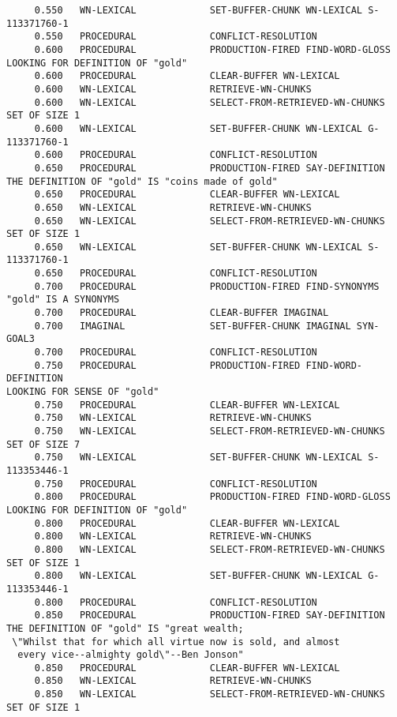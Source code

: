 \begin{verbatim}
     0.550   WN-LEXICAL             SET-BUFFER-CHUNK WN-LEXICAL S-113371760-1 
     0.550   PROCEDURAL             CONFLICT-RESOLUTION 
     0.600   PROCEDURAL             PRODUCTION-FIRED FIND-WORD-GLOSS 
LOOKING FOR DEFINITION OF "gold" 
     0.600   PROCEDURAL             CLEAR-BUFFER WN-LEXICAL 
     0.600   WN-LEXICAL             RETRIEVE-WN-CHUNKS 
     0.600   WN-LEXICAL             SELECT-FROM-RETRIEVED-WN-CHUNKS SET OF SIZE 1 
     0.600   WN-LEXICAL             SET-BUFFER-CHUNK WN-LEXICAL G-113371760-1 
     0.600   PROCEDURAL             CONFLICT-RESOLUTION 
     0.650   PROCEDURAL             PRODUCTION-FIRED SAY-DEFINITION 
THE DEFINITION OF "gold" IS "coins made of gold" 
     0.650   PROCEDURAL             CLEAR-BUFFER WN-LEXICAL 
     0.650   WN-LEXICAL             RETRIEVE-WN-CHUNKS 
     0.650   WN-LEXICAL             SELECT-FROM-RETRIEVED-WN-CHUNKS SET OF SIZE 1 
     0.650   WN-LEXICAL             SET-BUFFER-CHUNK WN-LEXICAL S-113371760-1 
     0.650   PROCEDURAL             CONFLICT-RESOLUTION 
     0.700   PROCEDURAL             PRODUCTION-FIRED FIND-SYNONYMS 
"gold" IS A SYNONYMS 
     0.700   PROCEDURAL             CLEAR-BUFFER IMAGINAL 
     0.700   IMAGINAL               SET-BUFFER-CHUNK IMAGINAL SYN-GOAL3 
     0.700   PROCEDURAL             CONFLICT-RESOLUTION 
     0.750   PROCEDURAL             PRODUCTION-FIRED FIND-WORD-DEFINITION 
LOOKING FOR SENSE OF "gold" 
     0.750   PROCEDURAL             CLEAR-BUFFER WN-LEXICAL 
     0.750   WN-LEXICAL             RETRIEVE-WN-CHUNKS 
     0.750   WN-LEXICAL             SELECT-FROM-RETRIEVED-WN-CHUNKS SET OF SIZE 7 
     0.750   WN-LEXICAL             SET-BUFFER-CHUNK WN-LEXICAL S-113353446-1 
     0.750   PROCEDURAL             CONFLICT-RESOLUTION 
     0.800   PROCEDURAL             PRODUCTION-FIRED FIND-WORD-GLOSS 
LOOKING FOR DEFINITION OF "gold" 
     0.800   PROCEDURAL             CLEAR-BUFFER WN-LEXICAL 
     0.800   WN-LEXICAL             RETRIEVE-WN-CHUNKS 
     0.800   WN-LEXICAL             SELECT-FROM-RETRIEVED-WN-CHUNKS SET OF SIZE 1 
     0.800   WN-LEXICAL             SET-BUFFER-CHUNK WN-LEXICAL G-113353446-1 
     0.800   PROCEDURAL             CONFLICT-RESOLUTION 
     0.850   PROCEDURAL             PRODUCTION-FIRED SAY-DEFINITION 
THE DEFINITION OF "gold" IS "great wealth;
 \"Whilst that for which all virtue now is sold, and almost 
  every vice--almighty gold\"--Ben Jonson" 
     0.850   PROCEDURAL             CLEAR-BUFFER WN-LEXICAL 
     0.850   WN-LEXICAL             RETRIEVE-WN-CHUNKS 
     0.850   WN-LEXICAL             SELECT-FROM-RETRIEVED-WN-CHUNKS SET OF SIZE 1 

\end{verbatim}
